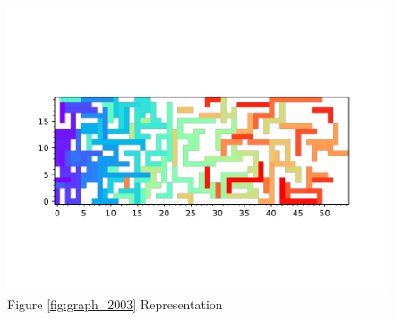 \documentclass{standalone}
\begin{document}
\begin{figure}[!htb]
	\caption{Figure \ref{fig:graph_2003} Representation}
	\label{fig:picture_2003}
	\includegraphics[width=\textwidth]{../graphs/picture/2003.pdf}
\end{figure}
\end{document}
